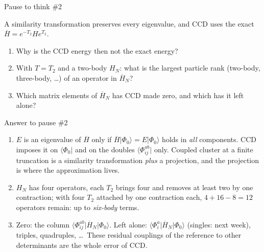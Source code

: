 \documentclass[aspectratio=169,10pt]{beamer}
\newcounter{thinkctr}
\newcommand{\thinkq}[2]{%
  \stepcounter{thinkctr}%
  \vfill
  \begin{tcolorbox}[enhanced,colback=palewarm,colframe=warm,boxrule=1.2pt,arc=4pt,
    grow to left by=6mm,grow to right by=6mm,
    left=16pt,right=16pt,top=16pt,bottom=18pt,
    fonttitle=\bfseries\Large,fontupper=\Large,
    title={Pause to think \#\thethinkctr\hfill\mdseries\normalsize(about #1 min -- discuss with your neighbour)}]
  #2
  \end{tcolorbox}
  \vfill}
\newcommand{\thinka}[1]{%
  \vfill
  \begin{tcolorbox}[enhanced,colback=paleteal,colframe=teal,boxrule=1.2pt,arc=4pt,
    grow to left by=6mm,grow to right by=6mm,
    left=16pt,right=16pt,top=16pt,bottom=18pt,
    fonttitle=\bfseries\Large,fontupper=\large,
    title={Answer to pause \#\thethinkctr}]
  #1
  \end{tcolorbox}
  \vfill}
\newcommand{\ket}[1]{\vert #1\rangle}
\newcommand{\bra}[1]{\langle #1\vert}
\newcommand{\mel}[3]{\langle #1\lvert #2\rvert #3\rangle}
\newcommand{\ph}{\Phi_0}
\newcommand{\Hbar}{\overline{H}}
\begin{document}
\begin{frame}{Pause to think \#2}
\thinkq{3}{A similarity transformation preserves every eigenvalue, and CCD uses the exact $\Hbar=e^{-T_2}He^{T_2}$.
\begin{enumerate}
\item Why is the CCD energy then not the exact energy?
\item With $T=T_2$ and a two-body $H_N$: what is the largest particle rank (two-body, three-body, \dots) of an operator in $\Hbar_N$?
\item Which matrix elements of $\Hbar_N$ has CCD made zero, and which has it left alone?
\end{enumerate}}
\end{frame}

\begin{frame}{Answer to pause \#2}
\thinka{%
\begin{enumerate}
\item $E$ is an eigenvalue of $\Hbar$ only if $\Hbar\ket{\ph}=E\ket{\ph}$ holds in \emph{all} components. CCD imposes it on $\bra{\ph}$ and on the doubles $\bra{\Phi_{ij}^{ab}}$ only. Coupled cluster at a finite truncation is a similarity transformation \emph{plus} a projection, and the projection is where the approximation lives.
\item $H_N$ has four operators, each $T_2$ brings four and removes at least two by one contraction; with four $T_2$ attached by one contraction each, $4+16-8=12$ operators remain: up to \emph{six-body} terms.
\item Zero: the column $\mel{\Phi_{ij}^{ab}}{\Hbar_N}{\ph}$. Left alone: $\mel{\Phi_i^a}{\Hbar_N}{\ph}$ (singles: next week), triples, quadruples, \dots\ These residual couplings of the reference to other determinants are the whole error of CCD.
\end{enumerate}}
\end{frame}
\end{document}
